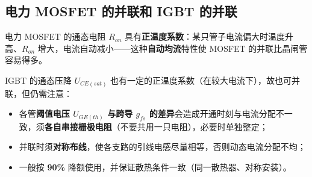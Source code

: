 
\subsection{电力 MOSFET 的并联和 IGBT 的并联}

电力 MOSFET 的通态电阻 $R_{on}$ 具有\textbf{正温度系数}：某只管子电流偏大时温度升高、$R_{on}$ 增大，电流自动减小——这种\textbf{自动均流}特性使 MOSFET 的并联比晶闸管容易得多。

IGBT 的通态压降 $U_{CE(sat)}$ 也有一定的正温度系数（在较大电流下），故也可并联，但仍需注意：

\begin{itemize}
  \item 各管\textbf{阈值电压 $U_{GE(th)}$ 与跨导 $g_{fs}$ 的差异}会造成开通时刻与电流分配不一致，须\textbf{各自串接栅极电阻}（不要共用一只电阻），必要时单独整定；
  \item 并联时须\textbf{对称布线}，使各支路的引线电感尽量相等，否则动态电流分配不均；
  \item 一般按 \textbf{90\%} 降额使用，并保证散热条件一致（同一散热器、对称安装）。
\end{itemize}

